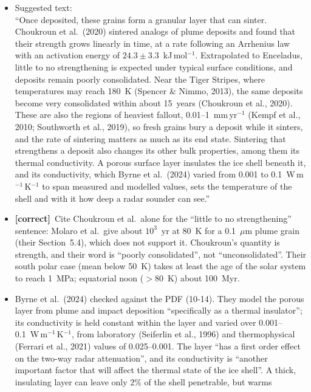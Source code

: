 \documentclass[11pt]{article}
\newcommand{\tC}{\textcolor{miss}{\textbf{[correct]}}\ }
\begin{document}
\begin{enumerate}
\begin{itemize}
  \item Suggested text:\\
    ``Once deposited, these grains form a granular layer that can sinter.
    Choukroun et al.\ (2020) sintered analogs of plume deposits and found
    that their strength grows linearly in time, at a rate following an
    Arrhenius law with an activation energy of $24.3 \pm 3.3$~kJ\,mol$^{-1}$.
    Extrapolated to Enceladus, little to no strengthening is expected under
    typical surface conditions, and deposits remain poorly consolidated.
    Near the Tiger Stripes, where temperatures may reach 180~K (Spencer \&
    Nimmo, 2013), the same deposits become very consolidated within about
    15~years (Choukroun et al., 2020). These are also the regions of
    heaviest fallout, 0.01--1~mm\,yr$^{-1}$ (Kempf et al., 2010; Southworth
    et al., 2019), so fresh grains bury a deposit while it sinters, and the
    rate of sintering matters as much as its end state. Sintering that
    strengthens a deposit also changes its other bulk properties, among
    them its thermal conductivity. A porous surface layer insulates the ice
    shell beneath it, and its conductivity, which Byrne et al.\ (2024)
    varied from 0.001 to 0.1~W\,m$^{-1}$\,K$^{-1}$ to span measured and
    modelled values, sets the temperature of the shell and with it how deep
    a radar sounder can see.''
  \item \tC Cite Choukroun et al.\ alone for the ``little to no
    strengthening'' sentence: Molaro et al.\ give about $10^3$~yr at 80~K
    for a 0.1~$\mu$m plume grain (their Section~5.4), which does not support
    it. Choukroun's quantity is strength, and their word is ``poorly
    consolidated'', not ``unconsolidated''. Their south polar case (mean
    below 50~K) takes at least the age of the solar system to reach 1~MPa;
    equatorial noon ($>80$~K) about 100~Myr.
  \item Byrne et al.\ (2024) checked against the PDF (10-14). They model
    the porous layer from plume and impact deposition ``specifically as a
    thermal insulator''; its conductivity is held constant within the layer
    and varied over 0.001--0.1~W\,m$^{-1}$\,K$^{-1}$, from laboratory
    (Seiferlin et al., 1996) and thermophysical (Ferrari et al., 2021)
    values of 0.025--0.001. The layer ``has a first order effect on the
    two-way radar attenuation'', and its conductivity is ``another important
    factor that will affect the thermal state of the ice shell''. A thick,
    insulating layer can leave only 2\% of the shell penetrable, but warms

\end{itemize}
\end{enumerate}
\end{document}
